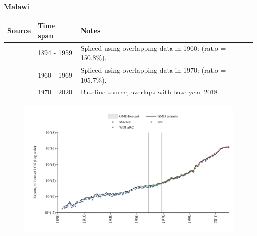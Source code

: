 \documentclass[12pt,a4paper,landscape]{article}
\begin{document}
\begin{adjustbox}{max totalsize={\paperwidth}{\paperheight},center}
\begin{minipage}[t][\textheight][t]{\textwidth}
\vspace*{0.5cm}
{}
\begin{center}
{\Large\bfseries Malawi}
\end{center}
\vspace{0.5cm}
\begin{table}[H]
\centering
\small
\begin{tabular}{|l|l|l|}
\hline
\textbf{Source} & \textbf{Time span} & \textbf{Notes} \\
\hline
\rowcolor{white}\cite{Mitchell}& 1894 - 1959 &Spliced using overlapping data in 1960: (ratio = 150.8\%).\\
\rowcolor{lightgray}\cite{WDI_ARC}& 1960 - 1969 &Spliced using overlapping data in 1970: (ratio = 105.7\%).\\
\rowcolor{white}\cite{UN}& 1970 - 2020 &Baseline source, overlaps with base year 2018.\\
\hline
\end{tabular}
\end{table}
\begin{figure}[H]
\centering
\includegraphics[width=\textwidth,height=0.6\textheight,keepaspectratio]{graphs/MWI_exports.pdf}
\end{figure}
\end{minipage}
\end{adjustbox}
\end{document}
